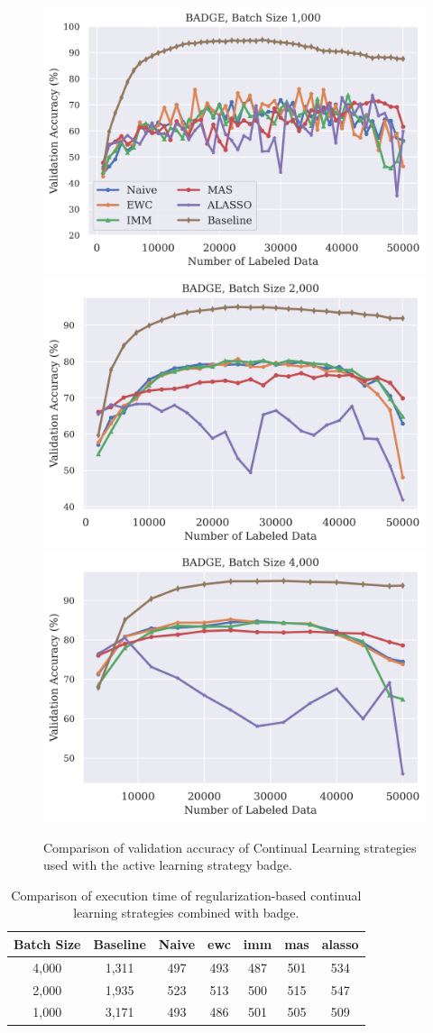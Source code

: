 \begin{figure}[h]
    \centering
    \includegraphics[width=0.32\linewidth]{images/results_CAL/badge_1000b_Comp.png} \hfill
    \includegraphics[width=0.32\linewidth]{images/results_CAL/badge_2000b_acc.png} \hfill
    \includegraphics[width=0.32\linewidth]{images/results_CAL/badge_4000b_acc.png}
    \caption[Continual active learning with \gls{badge} with varying batch size]{Comparison of validation accuracy of Continual Learning strategies used with the active learning strategy
    \gls{badge}.}
    \label{fig:Evaluation:CAL:VaryBatchSizeAcc}
\end{figure}


\begin{table}[h]
    \centering
    \begin{tabular}{c | c c c c c c} 
        Batch Size & Baseline & Naive & \gls{ewc} & \gls{imm} & \gls{mas} & \gls{alasso}\\ 
        \hline 
        4,000 & 1,311 & 497 & 493 & 487 & 501 & 534 \\
        2,000 & 1,935 & 523 & 513 & 500 & 515 & 547 \\
        1,000 & 3,171 & 493 & 486 & 501 & 505 & 509 \\
    \end{tabular}
    \caption{Comparison of execution time of regularization-based continual learning strategies
    combined with \gls{badge}.}
    \label{fig:Evaluation:CAL:BadgeVaryBatchSizeTime}
\end{table}

